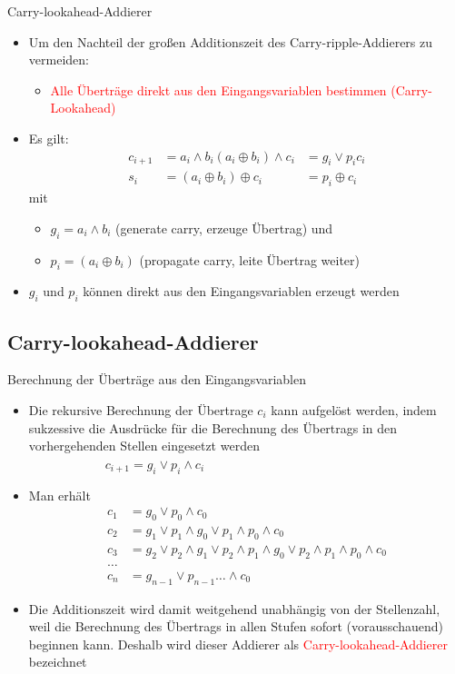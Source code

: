 \documentclass[12pt%
,xcolor=table
,aspectratio=169%
]{beamer}
\begin{document}
\begin{frame}{Carry-lookahead-Addierer}
\begin{itemize}
	\item Um den Nachteil der großen Additionszeit des Carry-ripple-Addierers zu vermeiden:
	\begin{itemize}
		\item \textcolor{red}{Alle Überträge direkt aus den Eingangsvariablen bestimmen (Carry-Lookahead)}
	\end{itemize}
	\item Es gilt:
	\begin{align*}
	c_{i+1}	&= a_i \land b_i (a_i \oplus b_i) \land c_i &= g_i \lor p_i c_i \\
	s_i 	&= (a_i \oplus b_i) \oplus c_i &= p_i \oplus c_i
	\end{align*}
	mit
	\begin{itemize}
		\item $g_i = a_i \land b_i$ (generate carry, erzeuge Übertrag) und
		\item $p_i = (a_i \oplus b_i)$ (propagate carry, leite Übertrag weiter)
	\end{itemize}
	\item $g_i$ und $p_i$ können direkt aus den Eingangsvariablen erzeugt werden
\end{itemize}
\end{frame}

\subsection{Carry-lookahead-Addierer}

\begin{frame}{Berechnung der Überträge aus den Eingangsvariablen}
\begin{itemize}
	\item Die rekursive Berechnung der Übertrage $c_i$ kann aufgelöst werden, indem sukzessive die Ausdrücke für die Berechnung des Übertrags in den vorhergehenden Stellen eingesetzt werden\\
	$\qquad \qquad \qquad c_{i+1} = g_i \lor p_i \land c_i$
	\item Man erhält
	\begin{align*}
	c_1 &= g_0 \lor p_0 \land c_0 \\
	c_2 &= g_1 \lor p_1 \land g_0 \lor p_1 \land p_0 \land c_0\\
	c_3 &= g_2 \lor p_2 \land g_1 \lor p_2 \land p_1 \land g_0 \lor p_2 \land p_1 \land p_0 \land c_0\\
	\ldots & \\
	c_n &= g_{n-1} \lor p_{n-1} \ldots \land c_0
	\end{align*}
	\item Die Additionszeit wird damit weitgehend unabhängig von der Stellenzahl, weil die Berechnung des
Übertrags in allen Stufen sofort (vorausschauend) beginnen kann. Deshalb wird dieser Addierer als \textcolor{red}{Carry-lookahead-Addierer} bezeichnet
\end{itemize}
\end{frame}
\end{document}

